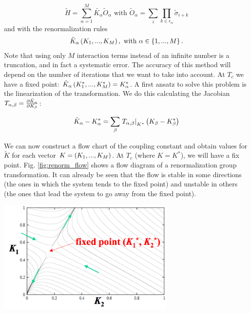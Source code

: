 \begin{equation}
\tilde{H} = \sum_{\alpha=1}^M{\tilde{K_{\alpha}} \tilde{O}_{\alpha}} 
\text{ with }
\tilde{O}_{\alpha} =  \sum_{i}{\prod_{k\in \epsilon_\alpha}{\tilde{\sigma}_{i+k}}} 
\end{equation}
and with the renormalization rules
$$
\tilde{K}_{\alpha}\left(K_1,...,K_M\right),  \text{ with } \alpha \in \left\{1,...,M\right\}.
$$
Note that using only $M$ interaction terms  instead of an infinite number is a truncation, and in fact a systematic error. The accuracy of this method will depend on the number of iterations that we want to take into account. At $T_c$ we have a fixed point: $\tilde{K}_{\alpha}\left(K_1^*,...,K_M^*\right)=K^*_\alpha$. A first ansatz to solve this problem is the linearization of the transformation. We do this calculating the Jacobian $T_{\alpha,\beta} = \frac{\partial \tilde{K}_\alpha}{\partial K_\beta}$:

\begin{equation}
 \tilde{K}_\alpha - K_\alpha^* = \sum_\beta { \left .T_{\alpha, \beta}\right|_{K^*}\ensuremath{\left(K_\beta - K_\beta^*\right)}}
 \label{eq:lin_trafo}
\end{equation}


\vspace{0.1cm}
\noindent
\begin{minipage}{\textwidth}
\begin{minipage}{.48\textwidth}
 We can now construct a flow chart of the coupling constant and obtain values for $\tilde{K}$ for each vector $K=\left(K_1,...,K_M\right)$. At $T_c$ (where $K=K^*$), we will have a fix point. Fig. \ref{fig:renorm_flow} shows a flow diagram of a renormalization group transformation. It can already be seen that the flow is stable in some directions (the ones in which the system tends to the fixed point) and unstable in others (the ones that lead the system to go away from the fixed point). 
 \end{minipage}\hfill
\begin{minipage}{.48\textwidth}
  \centering
  \includegraphics[height=160pt]{pics/renorm_flow}
  \label{fig:renorm_flow}
\end{minipage}
\end{minipage}

